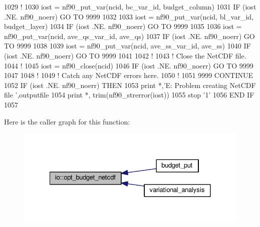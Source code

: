 \begin{DoxyCode}
1029     \textcolor{comment}{!}
1030     iost    = nf90\_put\_var(ncid, bc\_var\_id, budget\_column)
1031     \textcolor{keywordflow}{IF} (iost .NE. nf90\_noerr) \textcolor{keywordflow}{GO TO} 9999
1032 
1033     iost    = nf90\_put\_var(ncid, bl\_var\_id, budget\_layer)
1034     \textcolor{keywordflow}{IF} (iost .NE. nf90\_noerr) \textcolor{keywordflow}{GO TO} 9999
1035 
1036     iost    = nf90\_put\_var(ncid, ave\_qs\_var\_id, ave\_qs)
1037     \textcolor{keywordflow}{IF} (iost .NE. nf90\_noerr) \textcolor{keywordflow}{GO TO} 9999
1038 
1039     iost    = nf90\_put\_var(ncid, ave\_ss\_var\_id, ave\_ss)
1040     \textcolor{keywordflow}{IF} (iost .NE. nf90\_noerr) \textcolor{keywordflow}{GO TO} 9999
1041 
1042     \textcolor{comment}{!}
1043     \textcolor{comment}{! Close the NetCDF file.}
1044     \textcolor{comment}{!}
1045     iost    = nf90\_close(ncid)
1046     \textcolor{keywordflow}{IF} (iost .NE. nf90\_noerr) \textcolor{keywordflow}{GO TO} 9999
1047 
1048     \textcolor{comment}{!}
1049     \textcolor{comment}{! Catch any NetCDF errors here.}
1050     \textcolor{comment}{!}
1051     9999 \textcolor{keywordflow}{CONTINUE}
1052     \textcolor{keywordflow}{IF} (iost .NE. nf90\_noerr) \textcolor{keywordflow}{THEN}
1053         print *,\textcolor{stringliteral}{'E: Problem creating NetCDF file '},outputfile
1054         print *, trim(nf90\_strerror(iost))
1055         stop \textcolor{stringliteral}{'1'}
1056 \textcolor{keywordflow}{    END IF}
1057 
\end{DoxyCode}


Here is the caller graph for this function\+:\nopagebreak
\begin{figure}[H]
\begin{center}
\leavevmode
\includegraphics[width=328pt]{namespaceio_ab1a423779bddf2d4557f39dd81431d93_icgraph}
\end{center}
\end{figure}


